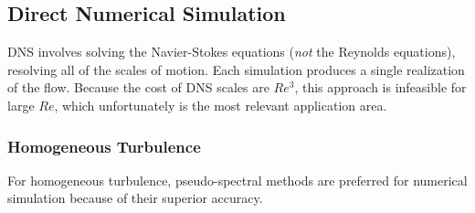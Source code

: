 \documentclass[10pt]{article}
\begin{document}
\begin{flushleft}
\subsection{Direct Numerical Simulation}
DNS involves solving the Navier-Stokes equations (\textit{not} the Reynolds equations), resolving all of the scales of motion. Each simulation produces a single realization of the flow. Because the cost of DNS scales are \(Re^3\), this approach is infeasible for large \(Re\), which unfortunately is the most relevant application area. 

\subsubsection{Homogeneous Turbulence}
For homogeneous turbulence, pseudo-spectral methods are preferred for numerical simulation because of their superior accuracy. 





\end{flushleft}
\end{document}

